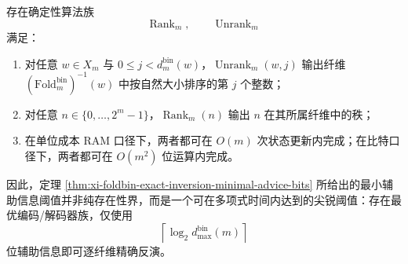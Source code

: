 \begin{theorem}\label{thm:xi-foldbin-rank-unrank-optimal-advice-polytime}
存在确定性算法族
\[
\operatorname{Rank}_m,\qquad \operatorname{Unrank}_m
\]
满足：
\begin{enumerate}
  \item 对任意 \(w\in X_m\) 与 \(0\le j<d_m^{\mathrm{bin}}(w)\)，\(\operatorname{Unrank}_m(w,j)\) 输出纤维 \((\mathrm{Fold}^{\mathrm{bin}}_m)^{-1}(w)\) 中按自然大小排序的第 \(j\) 个整数；
  \item 对任意 \(n\in\{0,\dots,2^m-1\}\)，\(\operatorname{Rank}_m(n)\) 输出 \(n\) 在其所属纤维中的秩；
  \item 在单位成本 RAM 口径下，两者都可在 \(O(m)\) 次状态更新内完成；在比特口径下，两者都可在 \(O(m^2)\) 位运算内完成。
\end{enumerate}
因此，定理 \ref{thm:xi-foldbin-exact-inversion-minimal-advice-bits} 所给出的最小辅助信息阈值并非纯存在性界，而是一个可在多项式时间内达到的尖锐阈值：存在最优编码/解码器族，仅使用
\[
\boxed{\;
\left\lceil \log_2 d_{\max}^{\mathrm{bin}}(m)\right\rceil\;}
\]
位辅助信息即可逐纤维精确反演。
\end{theorem}
